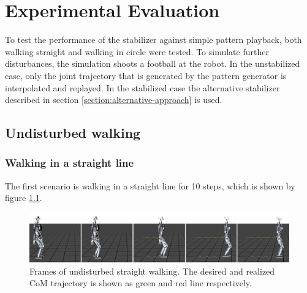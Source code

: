 \documentclass[english,ngerman]{KITreprt}
\begin{document}
\chapter{Experimental Evaluation}\label{experimental-evaluation}

To test the performance of the stabilizer against simple pattern
playback, both walking straight and walking in circle were tested. To
simulate further disturbances, the simulation shoots a football at the
robot. In the unstabilized case, only the joint trajectory that is
generated by the pattern generator is interpolated and replayed. In the
stabilized case the alternative stabilizer described in section
\ref{section:alternative-approach} is used.

\section{Undisturbed walking}\label{undisturbed-walking}

\subsection{Walking in a straight
line}\label{walking-in-a-straight-line}

The first scenario is walking in a straight line for 10 steps, which is
shown by figure \ref{img:player-undisturbed-straight-thumbs}.

\begin{figure}[H]
\vspace*{-1em}
\includegraphics[width=\textwidth]{images/undisturbed_straight_thumbs.png}
\caption{Frames of undisturbed straight walking. The desired and realized CoM trajectory is shown as green and red
line respectively.}
\label{img:player-undisturbed-straight-thumbs}
\end{figure}
\end{document}

